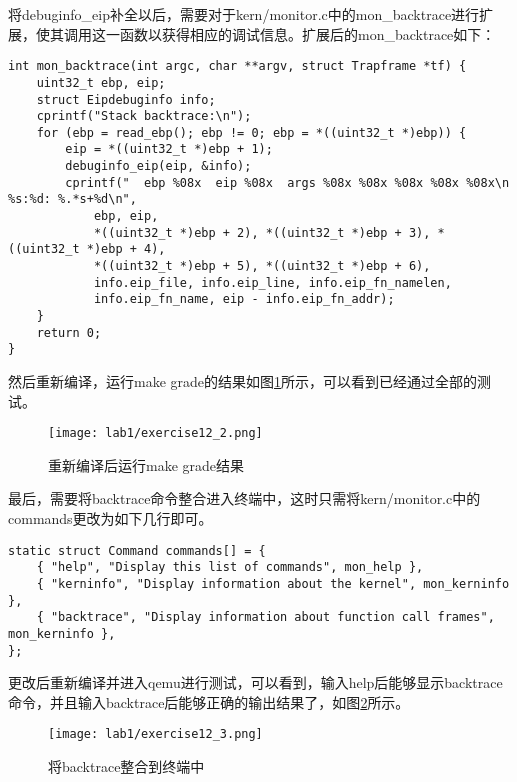 \begin{exerciseSolution}{12}
    \par 将debuginfo\_eip补全以后，需要对于kern/monitor.c中的mon\_backtrace进行扩展，使其调用这一函数以获得相应的调试信息。扩展后的mon\_backtrace如下：
    \begin{lstlisting}
int mon_backtrace(int argc, char **argv, struct Trapframe *tf) {
    uint32_t ebp, eip;
    struct Eipdebuginfo info;
    cprintf("Stack backtrace:\n");
    for (ebp = read_ebp(); ebp != 0; ebp = *((uint32_t *)ebp)) {
        eip = *((uint32_t *)ebp + 1);
        debuginfo_eip(eip, &info);
        cprintf("  ebp %08x  eip %08x  args %08x %08x %08x %08x %08x\n      %s:%d: %.*s+%d\n",
            ebp, eip,
            *((uint32_t *)ebp + 2), *((uint32_t *)ebp + 3), *((uint32_t *)ebp + 4),
            *((uint32_t *)ebp + 5), *((uint32_t *)ebp + 6),
            info.eip_file, info.eip_line, info.eip_fn_namelen,
            info.eip_fn_name, eip - info.eip_fn_addr);
    }
    return 0;
}
    \end{lstlisting}
    \par 然后重新编译，运行make grade的结果如图\ref{fig:exercise12_2}所示，可以看到已经通过全部的测试。
    \begin{figure}[htb]
        \centering
        \texttt{[image: lab1/exercise12\_2.png]}
        \caption{重新编译后运行make grade结果}
        \label{fig:exercise12_2}
    \end{figure}
    \par 最后，需要将backtrace命令整合进入终端中，这时只需将kern/monitor.c中的commands更改为如下几行即可。
    \begin{lstlisting}
static struct Command commands[] = {
    { "help", "Display this list of commands", mon_help },
    { "kerninfo", "Display information about the kernel", mon_kerninfo },
    { "backtrace", "Display information about function call frames", mon_kerninfo },
};
    \end{lstlisting}
    \par 更改后重新编译并进入qemu进行测试，可以看到，输入help后能够显示backtrace命令，并且输入backtrace后能够正确的输出结果了，如图\ref{fig:exercise12_3}所示。
    \begin{figure}[htb]
        \centering
        \texttt{[image: lab1/exercise12\_3.png]}
        \caption{将backtrace整合到终端中}
        \label{fig:exercise12_3}
    \end{figure}
    \FloatBarrier
\end{exerciseSolution}



